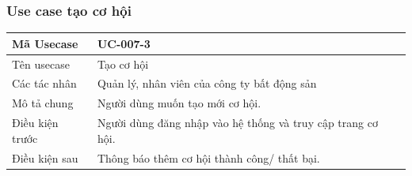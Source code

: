 \documentclass[12pt,a4paper]{article}
\begin{document}
    \subsubsection*{Use case tạo cơ hội}
    \begin{table}[H]
        \centering
        \begin{tabular}{|p{3.5cm}|p{11.5cm}|c|}
            \hline
            Mã Usecase      & UC-007-3                                                    \\
            \hline
            Tên usecase     & Tạo cơ hội                                                  \\
            \hline
            Các tác nhân    & Quản lý, nhân viên của công ty bất động sản                 \\
            \hline
            Mô tả chung     & Người dùng muốn tạo mới cơ hội.                             \\
            \hline

            Điều kiện trước & Người dùng đăng nhập vào hệ thống và truy cập trang cơ hội. \\
            \hline

            Điều kiện sau   & Thông báo thêm cơ hội thành công/ thất bại.                 \\
            \hline


\end{tabular}
\end{table}
\end{document}
